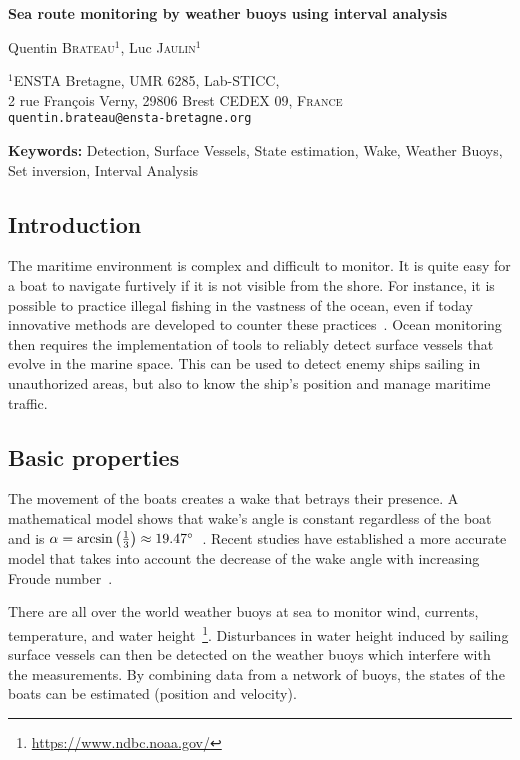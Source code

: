\documentclass[14pt, a4paper]{article}
\begin{document}
	\begin{center}

		{\Large\bf Sea route monitoring by weather buoys using interval analysis}

		\vspace*{0.8cm}

		{\large Quentin \textsc{Brateau}$^{1}$, Luc \textsc{Jaulin}$^{1}$}

		\bigskip

		{\small $^{1}$ENSTA Bretagne, UMR 6285, Lab-STICC, \\
		2 rue François Verny, 29806 Brest CEDEX 09, \textsc{France} \\
		\texttt{quentin.brateau@ensta-bretagne.org}
		}

	\end{center}

	\bigskip

	{\noindent\bf Keywords:} Detection, Surface Vessels, State estimation, Wake, Weather Buoys, Set inversion, Interval Analysis

	\subsection*{Introduction}
		The maritime environment is complex and difficult to monitor. It is quite easy for a boat to navigate furtively if it is not visible from the shore. For instance, it is possible to practice illegal fishing in the vastness of the ocean, even if today innovative methods are developed to counter these practices~\cite{doi:10.1073/pnas.1915499117}. Ocean monitoring then requires the implementation of tools to reliably detect surface vessels that evolve in the marine space. This can be used to detect enemy ships sailing in unauthorized areas, but also to know the ship's position and manage maritime traffic.

	\subsection*{Basic properties}
		The movement of the boats creates a wake that betrays their presence. A mathematical model shows that wake's angle is constant regardless of the boat and is $\alpha = \arcsin\left(\frac{1}{3}\right) \approx 19.47 \degree$~\cite{thomson1887ship, stoker1992water}. Recent studies have established a more accurate model that takes into account the decrease of the wake angle with increasing Froude number~\cite{Rabaud_2013}.
		
		There are all over the world weather buoys at sea to monitor wind, currents, temperature, and water height~\footnote{\url{https://www.ndbc.noaa.gov/}}. Disturbances in water height induced by sailing surface vessels can then be detected on the weather buoys which interfere with the measurements. By combining data from a network of buoys, the states of the boats can be estimated (position and velocity).
\end{document}
